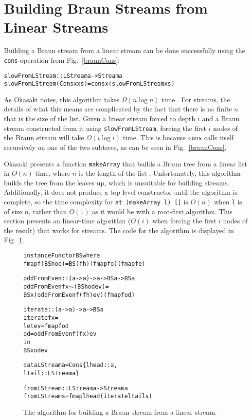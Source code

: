 \documentclass[envcountsect]{llncs}
\begin{document}
\section{Building Braun Streams from Linear Streams}
\label{iterSect}

Building a Braun stream from a linear stream can be done successfully using the {\tt cons} operation from Fig.~\ref{braunCons}:

\begin{alltt}
slowFromLStream :: LStream a -> Stream a
slowFromLStream (Cons x xs) = cons x (slowFromLStream xs)
\end{alltt}

As Okasaki notes, this algorithm takes $\Omega(n \log n)$ time \cite{okasakiBraun}.
For streams, the details of what this means are complicated by the fact that there is no finite $n$ that is the size of the list.
Given a linear stream forced to depth $i$ and a Braun stream constructed from it using {\tt slowFromLStream}, forcing the first $i$ nodes of the Braun stream will take $\Omega(i \log i)$ time.
This is because {\tt cons} calls itself recursively on one of the two subtrees, as can be seen in Fig.~\ref{braunCons}.

Okasaki presents a function {\tt makeArray} that builds a Braun tree from a linear list in $O(n)$ time, where $n$ is the length of the list \cite{okasakiBraun}.
Unfortunately, this algorithm builds the tree from the leaves up, which is unsuitable for building streams.
Additionally, it does not produce a top-level constructor until the algorithm is complete, so the time complexity for {\tt at (makeArray l) []} is $O(n)$ when {\tt l} is of size $n$, rather than $O(1)$ as it would be with a root-first algorithm.
This section presents an linear-time algorithm ($O(i)$ when forcing the first $i$ nodes of the result) that works for streams.
The code for the algorithm is displayed in Fig.~\ref{iterateCode}.

\begin{figure}
\begin{alltt}
instance Functor BS where
    fmap f (BS h o e) = BS (f h) (fmap f o) (fmap f e)

oddFromEven :: (a -> a) -> a -> BS a -> BS a
oddFromEven f x  \(\sim\)(BS h od ev) =
    BS x (oddFromEven f (f h) ev) (fmap f od)

iterate :: (a -> a) -> a -> BS a
iterate f x =
    let ev = fmap f od
        od = oddFromEven f (f x) ev
    in
      BS x od ev

data LStream a = Cons \{lhead::a,
                       ltail::LStream a\}

fromLStream :: LStream a -> Stream a
fromLStream s = fmap lhead (iterate ltail s)
\end{alltt}
\caption{The algorithm for building a Braun stream from a linear stream.}
\label{iterateCode}
\end{figure}
\end{document}
